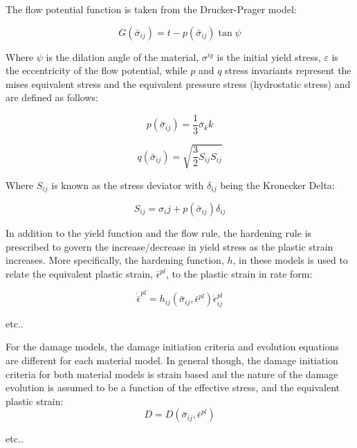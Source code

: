 The flow potential function is taken from the Drucker-Prager model:

\begin{equation}
G\left(\bar{\sigma}_{ij}\right)=t-p\left(\bar{\sigma}_{ij}\right)\tan\psi\label{eqn:const11}
\end{equation}

Where $\psi$ is the dilation angle of the material, $\sigma^{iy}$ is the initial yield stress, $\varepsilon$ is the eccentricity of the flow potential, while $p$ and $q$ stress invariants represent the mises equivalent stress and the equivalent pressure stress (hydrostatic stress) and are defined as follows:

\begin{equation}
p\left(\bar{\sigma}_{ij}\right)=\frac{1}{3}\bar{\sigma}_kk
\label{eqn:druc3}
\end{equation}

\begin{equation}
q\left(\bar{\sigma}_{ij}\right)=\sqrt{\frac{3}{2}S_{ij}S_{ij}}\label{eqn:druc4}
\end{equation}

Where $S_{ij}$ is known as the stress deviator with $\delta_{ij}$ being the Kronecker Delta:

\begin{equation}
S_{ij} = \sigma_ij + p\left(\bar{\sigma}_{ij}\right)\delta_{ij}
\end{equation}

In addition to the yield function and the flow rule, the hardening rule is prescribed to govern the increase/decrease in yield stress as the plastic strain increases. More specifically, the hardening function, $h$, in these models is used to relate the equivalent plastic strain, $\bar{\epsilon}^{pl}$,  to the plastic strain in rate form: 

\begin{equation}
    \dot{\bar{\epsilon}}^{pl} 
    = 
    h_{ij}
    \left(
        \bar{\sigma}_{ij}, \bar{\epsilon}^{pl}
    \right)
    \dot{\epsilon}^{pl}_{ij}
\label{eqn:const8d}
\end{equation}

etc..

For the damage models, the damage initiation criteria and evolution equations are different for each material model. In general though, the damage initiation criteria for both material models is strain based and the nature of the damage evolution is assumed to be a function of the effective stress, and the equivalent plastic strain:
\begin{equation}
D=D\left(\bar{\sigma}_{ij},\bar{\epsilon}^{pl}\right)\label{eqn:const8}
\end{equation}



etc..
